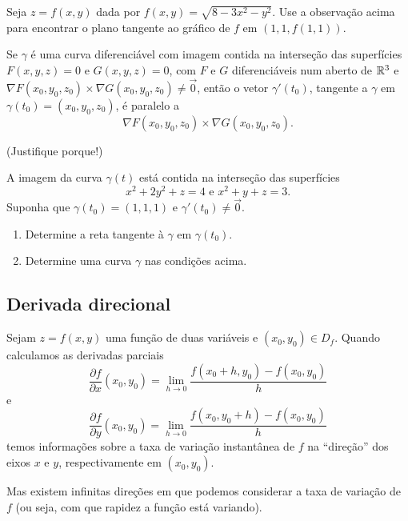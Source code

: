\begin{exercise}
    Seja \(z = f(x,y)\) dada por \(f(x,y) = \sqrt{8-3x^2 - y^2}\). Use a observação acima para encontrar o plano tangente ao gráfico de \(f\) em \((1,1,f(1,1))\).
\end{exercise}

\begin{remark}
    Se \(\gamma\) é uma curva diferenciável com imagem contida na interseção das superfícies \(F(x,y,z) = 0\) e \(G(x,y,z) = 0\), com \(F\) e \(G\) diferenciáveis num aberto de \(\mathbb{R}^3\) e \(\nabla F(x_0,y_0,z_0) \times \nabla G(x_0,y_0,z_0) \neq \overrightarrow{0}\), então o vetor \(\gamma'(t_0)\), tangente a \(\gamma\) em \(\gamma(t_0) = (x_0,y_0,z_0)\), é paralelo a \[\nabla F(x_0,y_0,z_0)\times \nabla G(x_0,y_0,z_0).\]

    (Justifique porque!)
\end{remark}

\begin{exercise}
    A imagem da curva \(\gamma(t)\) está contida na interseção das superfícies \[x^2 + 2y^2 + z = 4 \text{ e } x^2 + y + z = 3.\] Suponha que \(\gamma(t_0) = (1,1,1)\) e \(\gamma'(t_0) \neq \overrightarrow{0}\).
        \begin{enumerate}
            \item Determine a reta tangente à \(\gamma\) em \(\gamma(t_0)\).
            \item Determine uma curva \(\gamma\) nas condições acima.
        \end{enumerate}
\end{exercise}

\subsection{Derivada direcional}

Sejam \(z = f(x,y)\) uma função de duas variáveis e \((x_0,y_0)\in D_f\). Quando calculamos as derivadas parciais \[\frac{\partial f}{\partial x}(x_0,y_0) = \lim_{h\to 0} \frac{f(x_0+h,y_0) - f(x_0,y_0)}{h}\] e \[\frac{\partial f}{\partial y}(x_0,y_0) = \lim_{h\to 0} \frac{f(x_0,y_0+h) - f(x_0,y_0)}{h}\] temos informações sobre a taxa de variação instantânea de \(f\) na ``direção'' dos eixos \(x\) e \(y\), respectivamente em \((x_0,y_0)\).

Mas existem infinitas direções em que podemos considerar a taxa de variação de \(f\) (ou seja, com que rapidez a função está variando).

